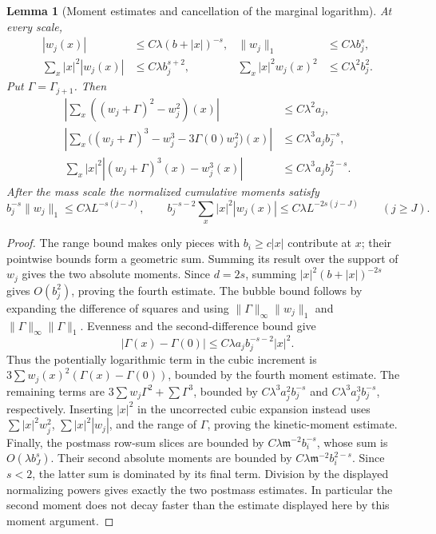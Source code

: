 \documentclass[11pt]{article}
\newtheorem{lemma}[proposition]{Lemma}
\begin{document}
\begin{lemma}[Moment estimates and cancellation of the marginal logarithm]
\label{completion:moments}
At every scale,
\begin{align*}
 |w_j(x)|&\le C\lambda(b+|x|)^{-s},&
 \|w_j\|_1&\le C\lambda b_j^s,\\
 \sum_x|x|^2|w_j(x)|&\le C\lambda b_j^{s+2},&
 \sum_x|x|^2w_j(x)^2&\le C\lambda^2b_j^2.
\end{align*}
Put \(\Gamma=\Gamma_{j+1}\). Then
\begin{align*}
 \left|\sum_x((w_j+\Gamma)^2-w_j^2)(x)\right|
    &\le C\lambda^2a_j,\\
 \left|\sum_x\big((w_j+\Gamma)^3-w_j^3
                   -3\Gamma(0)w_j^2\big)(x)\right|
    &\le C\lambda^3a_j b_j^{-s},\\
 \sum_x|x|^2\left|(w_j+\Gamma)^3(x)-w_j^3(x)\right|
    &\le C\lambda^3a_j b_j^{2-s}.
\end{align*}
After the mass scale the normalized cumulative moments satisfy
\[
 b_j^{-s}\|w_j\|_1\le C\lambda L^{-s(j-J)},\qquad
 b_j^{-s-2}\sum_x|x|^2|w_j(x)|
       \le C\lambda L^{-2s(j-J)}\qquad(j\ge J).
\]
\end{lemma}
\begin{proof}
The range bound makes only pieces with \(b_i\ge c|x|\) contribute
at \(x\); their pointwise bounds form a geometric sum. Summing its
result over the support of \(w_j\) gives the two absolute moments.
Since \(d=2s\), summing \(|x|^2(b+|x|)^{-2s}\) gives
\(O(b_j^2)\), proving the fourth estimate.
The bubble bound follows by expanding the difference of squares and
using \(\|\Gamma\|_\infty\|w_j\|_1\) and
\(\|\Gamma\|_\infty\|\Gamma\|_1\).
Evenness and the second-difference bound give
\[
 |\Gamma(x)-\Gamma(0)|
       \le C\lambda a_j b_j^{-s-2}|x|^2.
\]
Thus the potentially logarithmic term in the cubic increment is
\(3\sum w_j(x)^2(\Gamma(x)-\Gamma(0))\), bounded by the fourth
moment estimate. The remaining terms are
\(3\sum w_j\Gamma^2+\sum\Gamma^3\), bounded by
\(C\lambda^3a_j^2b_j^{-s}\) and
\(C\lambda^3a_j^3b_j^{-s}\), respectively.
Inserting \(|x|^2\) in the uncorrected cubic expansion instead
uses \(\sum|x|^2w_j^2\), \(\sum|x|^2|w_j|\), and the
range of \(\Gamma\), proving the kinetic-moment estimate.
Finally, the postmass row-sum slices are bounded by
\(C\lambda\mathfrak m^{-2}b_i^{-s}\), whose sum is
\(O(\lambda b_J^s)\). Their second absolute moments are bounded by
\(C\lambda\mathfrak m^{-2}b_i^{2-s}\). Since \(s<2\), the latter sum
is dominated by its final term. Division by the displayed normalizing
powers gives exactly the two postmass estimates. In particular the
second moment does not decay faster than the estimate displayed here by this moment argument.
\end{proof}
\end{document}
